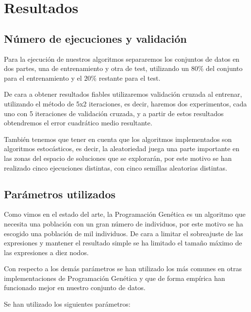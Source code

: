 \section{Resultados}

\subsection{Número de ejecuciones y validación}

Para la ejecución de nuestros algoritmos separaremos los conjuntos de datos en dos partes, una de entrenamiento y otra de test, utilizando un $80\%$ del conjunto para el entrenamiento y el $20\%$ restante para el test.

De cara a obtener resultados fiables utilizaremos validación cruzada al entrenar, utilizando el método de 5x2 iteraciones, es decir, haremos dos experimentos, cada uno con 5 iteraciones de validación cruzada, y a partir de estos resultados obtendremos el error cuadrático medio resultante.

También tenemos que tener en cuenta que los algoritmos implementados son algoritmos estocásticos, es decir, la aleatoriedad juega una parte importante en las zonas del espacio de soluciones que se explorarán, por este motivo se han realizado cinco ejecuciones distintas, con cinco semillas aleatorias distintas.

\subsection{Parámetros utilizados}

Como vimos en el estado del arte, la Programación Genética es un algoritmo que necesita una población con un gran número de individuos, por este motivo se ha escogido una población de mil individuos. De cara a limitar el sobreajuste de las expresiones y mantener el resultado simple se ha limitado el tamaño máximo de las expresiones a diez nodos.

Con respecto a los demás parámetros se han utilizado los más comunes en otras implementaciones de Programación Genética y que de forma empírica han funcionado mejor en nuestro conjunto de datos.

Se han utilizado los siguientes parámetros:

